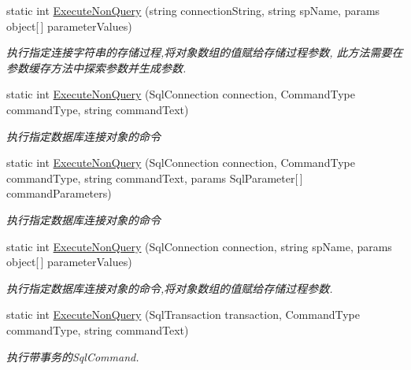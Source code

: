 \begin{DoxyCompactItemize}
static int \hyperlink{class_x_c_l_net_tools_1_1_data_base_1_1_m_s_s_q_l_1_1_sql_helper_a81e71567fe527b8c2a53c0d51c4237bf}{Execute\+Non\+Query} (string connection\+String, string sp\+Name, params object\mbox{[}$\,$\mbox{]} parameter\+Values)
\begin{DoxyCompactList}\small\item\em 执行指定连接字符串的存储过程,将对象数组的值赋给存储过程参数, 此方法需要在参数缓存方法中探索参数并生成参数. \end{DoxyCompactList}\item 
static int \hyperlink{class_x_c_l_net_tools_1_1_data_base_1_1_m_s_s_q_l_1_1_sql_helper_a472dab96a9cbd203dcd6b405c1117d60}{Execute\+Non\+Query} (Sql\+Connection connection, Command\+Type command\+Type, string command\+Text)
\begin{DoxyCompactList}\small\item\em 执行指定数据库连接对象的命令 \end{DoxyCompactList}\item 
static int \hyperlink{class_x_c_l_net_tools_1_1_data_base_1_1_m_s_s_q_l_1_1_sql_helper_a7db7b9f1a9ef47844c9e3f25f41ca57b}{Execute\+Non\+Query} (Sql\+Connection connection, Command\+Type command\+Type, string command\+Text, params Sql\+Parameter\mbox{[}$\,$\mbox{]} command\+Parameters)
\begin{DoxyCompactList}\small\item\em 执行指定数据库连接对象的命令 \end{DoxyCompactList}\item 
static int \hyperlink{class_x_c_l_net_tools_1_1_data_base_1_1_m_s_s_q_l_1_1_sql_helper_a61929b6c26c4fe2d70271ba4ace7125b}{Execute\+Non\+Query} (Sql\+Connection connection, string sp\+Name, params object\mbox{[}$\,$\mbox{]} parameter\+Values)
\begin{DoxyCompactList}\small\item\em 执行指定数据库连接对象的命令,将对象数组的值赋给存储过程参数. \end{DoxyCompactList}\item 
static int \hyperlink{class_x_c_l_net_tools_1_1_data_base_1_1_m_s_s_q_l_1_1_sql_helper_a480185da9390a493ada4ec7bab8829db}{Execute\+Non\+Query} (Sql\+Transaction transaction, Command\+Type command\+Type, string command\+Text)
\begin{DoxyCompactList}\small\item\em 执行带事务的\+Sql\+Command. \end{DoxyCompactList}\item 

\end{DoxyCompactItemize}

